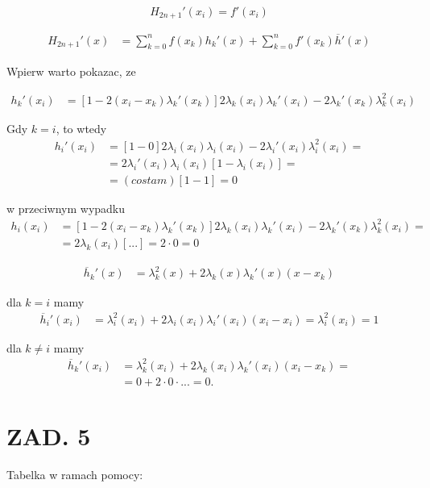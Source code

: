 \documentclass{article}[16pt]
\begin{document}
$$H_{2n+1}'(x_i)=f'(x_i)$$

\begin{align*}
    H_{2n+1}'(x)&=\sum\limits_{k=0}^nf(x_k)h_k'(x)+\sum\limits_{k=0}^nf'(x_k)\overline{h}'(x)
\end{align*}

Wpierw warto pokazac, ze

\begin{align*}
    h_k'(x_i)&=[1-2(x_i-x_k)\lambda_k'(x_k)]2\lambda_k(x_i)\lambda_k'(x_i)-2\lambda_k'(x_k)\lambda_k^2(x_i)
\end{align*}

Gdy $k=i$, to wtedy
\begin{align*}
    h_i'(x_i)&=[1-0]2\lambda_i(x_i)\lambda_i(x_i)-2\lambda_i'(x_i)\lambda_i^2(x_i)=\\
    &=2\lambda_i'(x_i)\lambda_i(x_i)[1-\lambda_i(x_i)]=\\
    &=(costam)[1-1]=0
\end{align*}

w przeciwnym wypadku
\begin{align*}
    h_i(x_i)&=[1-2(x_i-x_k)\lambda_k'(x_k)]2\lambda_k(x_i)\lambda_k'(x_i)-2\lambda_k'(x_k)\lambda_k^2(x_i)=\\
    &=2\lambda_k(x_i)[...]=2\cdot 0=0
\end{align*}

\begin{align*}
    \overline{h}_k'(x)&=\lambda_k^2(x)+2\lambda_k(x)\lambda_k'(x)(x-x_k)
\end{align*}

dla $k=i$ mamy
\begin{align*}
    \overline{h}_i'(x_i)&=\lambda_i^2(x_i)+2\lambda_i(x_i)\lambda_i'(x_i)(x_i-x_i)=\lambda_i^2(x_i)=1
\end{align*}

dla $k\neq i$ mamy
\begin{align*}
    \overline{h}_k'(x_i)&=\lambda_k^2(x_i)+2\lambda_k(x_i)\lambda_k'(x_i)(x_i-x_k)=\\
    &=0+2\cdot 0\cdot...=0.
\end{align*}


\section*{ZAD. 5}

Tabelka w ramach pomocy:
\end{document}
